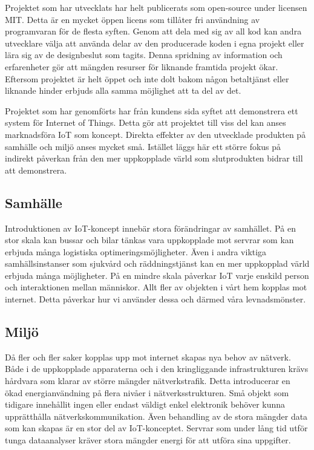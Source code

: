 Projektet som har utvecklats har helt publicerats som open-source under licensen MIT\cite{MIT-license}. Detta är en mycket öppen licens som tillåter fri användning av programvaran för de flesta syften. Genom att dela med sig av all kod kan andra utvecklare välja att använda delar av den producerade koden i egna projekt eller lära sig av de designbeslut som tagits. Denna spridning av information och erfarenheter gör att mängden resurser för liknande framtida projekt ökar. Eftersom projektet är helt öppet och inte dolt bakom någon betaltjänst eller liknande hinder erbjuds alla samma möjlighet att ta del av det.

Projektet som har genomförts har från kundens sida syftet att demonstrera ett system för Internet of Things. Detta gör att projektet till viss del kan anses marknadsföra IoT som koncept. Direkta effekter av den utvecklade produkten på samhälle och miljö anses mycket små. Istället läggs här ett större fokus på indirekt påverkan från den mer uppkopplade värld som slutprodukten bidrar till att demonstrera.

\subsection{Samhälle}
Introduktionen av IoT-koncept innebär stora förändringar av samhället. På en stor skala kan bussar och bilar tänkas vara uppkopplade mot servrar som kan erbjuda många logistiska optimeringsmöjligheter. Även i andra viktiga samhällsinstanser som sjukvård och räddningstjänst kan en mer uppkopplad värld erbjuda många möjligheter. På en mindre skala påverkar IoT varje enskild person och interaktionen mellan människor. Allt fler av objekten i vårt hem kopplas mot internet. Detta påverkar hur vi använder dessa och därmed våra levnadsmönster.

\subsection{Miljö}
Då fler och fler saker kopplas upp mot internet skapas nya behov av nätverk. Både i de uppkopplade apparaterna och i den kringliggande infrastrukturen krävs hårdvara som klarar av större mängder nätverkstrafik. Detta introducerar en ökad energianvändning på flera nivåer i nätverksstrukturen. Små objekt som tidigare innehållit ingen eller endast väldigt enkel elektronik behöver kunna upprätthålla nätverkskommunikation. Även behandling av de stora mängder data som kan skapas är en stor del av IoT-konceptet. Servrar som under lång tid utför tunga dataanalyser kräver stora mängder energi för att utföra sina uppgifter.

